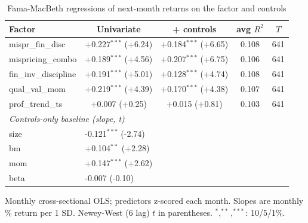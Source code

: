 \begin{table}[htbp]\centering
\caption{Fama-MacBeth regressions of next-month returns on the factor and controls}
\label{tab:fm}
\begin{threeparttable}\footnotesize
\begin{tabular}{lcccc}
\toprule
Factor & Univariate & + controls & avg $R^2$ & $T$ \\
\midrule
mispr\_fin\_disc & +0.227$^{***}$ (+6.24) & +0.184$^{***}$ (+6.65) & 0.108 & 641 \\
mispricing\_combo & +0.189$^{***}$ (+4.56) & +0.207$^{***}$ (+6.75) & 0.106 & 641 \\
fin\_inv\_discipline & +0.191$^{***}$ (+5.01) & +0.128$^{***}$ (+4.74) & 0.108 & 641 \\
qual\_val\_mom & +0.219$^{***}$ (+4.39) & +0.170$^{***}$ (+4.38) & 0.107 & 641 \\
prof\_trend\_ts & +0.007 (+0.25) & +0.015 (+0.81) & 0.103 & 641 \\
\midrule
\multicolumn{5}{l}{\textit{Controls-only baseline (slope, t)}} \\
size & \multicolumn{2}{l}{-0.121$^{***}$ (-2.74)} & & \\
bm & \multicolumn{2}{l}{+0.104$^{**}$ (+2.28)} & & \\
mom & \multicolumn{2}{l}{+0.147$^{***}$ (+2.62)} & & \\
beta & \multicolumn{2}{l}{-0.007 (-0.10)} & & \\
\bottomrule
\end{tabular}
\begin{tablenotes}\footnotesize
\item Monthly cross-sectional OLS; predictors z-scored each month. Slopes are monthly \% return per 1 SD. Newey-West (6 lag) $t$ in parentheses. $^{*},^{**},^{***}$: 10/5/1\%.
\end{tablenotes}
\end{threeparttable}
\end{table}
